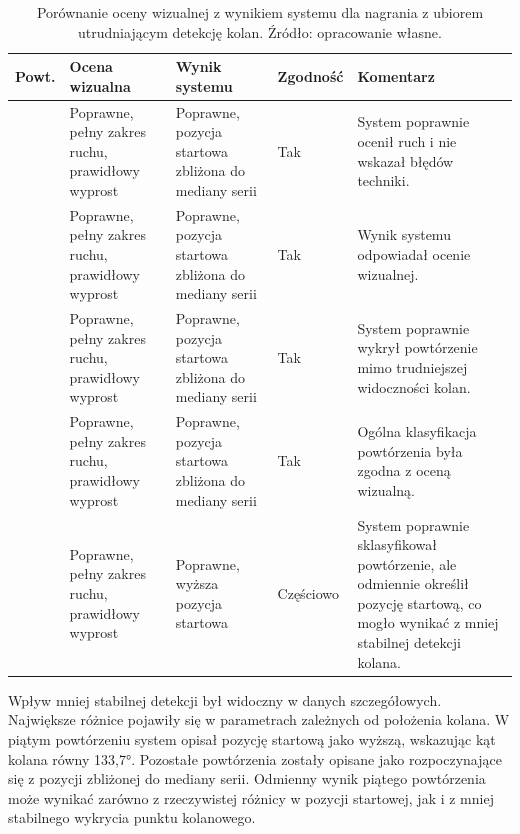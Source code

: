 \begin{table}[H]
\centering
\caption{Porównanie oceny wizualnej z wynikiem systemu dla nagrania z ubiorem utrudniającym detekcję kolan. Źródło: opracowanie własne.}
\label{tab:porownanie-ubior-kolana}
\footnotesize
\renewcommand{\arraystretch}{1.08}
\setlength{\tabcolsep}{2.5pt}
\begin{tabular}{|
>{\centering\arraybackslash}p{1.05cm}|
>{\raggedright\arraybackslash}p{4.15cm}|
>{\raggedright\arraybackslash}p{4.05cm}|
>{\centering\arraybackslash}p{1.55cm}|
>{\raggedright\arraybackslash}p{3.85cm}|}
\hline
\textbf{Powt.} & \textbf{Ocena wizualna} & \textbf{Wynik systemu} & \textbf{Zgodność} & \textbf{Komentarz} \\ \hline
1 & Poprawne, pełny zakres ruchu, prawidłowy wyprost & Poprawne, pozycja startowa zbliżona do mediany serii & Tak & System poprawnie ocenił ruch i nie wskazał błędów techniki. \\ \hline
2 & Poprawne, pełny zakres ruchu, prawidłowy wyprost & Poprawne, pozycja startowa zbliżona do mediany serii & Tak & Wynik systemu odpowiadał ocenie wizualnej. \\ \hline
3 & Poprawne, pełny zakres ruchu, prawidłowy wyprost & Poprawne, pozycja startowa zbliżona do mediany serii & Tak & System poprawnie wykrył powtórzenie mimo trudniejszej widoczności kolan. \\ \hline
4 & Poprawne, pełny zakres ruchu, prawidłowy wyprost & Poprawne, pozycja startowa zbliżona do mediany serii & Tak & Ogólna klasyfikacja powtórzenia była zgodna z oceną wizualną. \\ \hline
5 & Poprawne, pełny zakres ruchu, prawidłowy wyprost & Poprawne, wyższa pozycja startowa & Częściowo & System poprawnie sklasyfikował powtórzenie, ale odmiennie określił pozycję startową, co mogło wynikać z mniej stabilnej detekcji kolana. \\ \hline
\end{tabular}
\end{table}

Wpływ mniej stabilnej detekcji był widoczny w danych szczegółowych. Największe różnice pojawiły się w parametrach zależnych od położenia kolana. W piątym powtórzeniu system opisał pozycję startową jako wyższą, wskazując kąt kolana równy 133{,}7°. Pozostałe powtórzenia zostały opisane jako rozpoczynające się z pozycji zbliżonej do mediany serii. Odmienny wynik piątego powtórzenia może wynikać zarówno z rzeczywistej różnicy w pozycji startowej, jak i z mniej stabilnego wykrycia punktu kolanowego.

